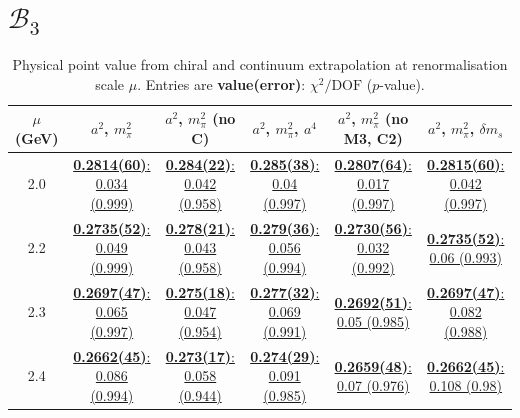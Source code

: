 \documentclass[12pt]{extarticle}
\begin{document}
\section{$\mathcal{B}_3$}
\begin{table}[h!]
\begin{center}
\begin{tabular}{|c|c|c|c|c|c|}
\hline
$\mu$ (GeV) & $a^2$, $m_\pi^2$& $a^2$, $m_\pi^2$ (no C)& $a^2$, $m_\pi^2$, $a^4$& $a^2$, $m_\pi^2$ (no M3, C2)& $a^2$, $m_\pi^2$, $\delta m_s$\\
\hline
2.0& \hyperlink{SSmPP/SUSY/bag_a2m2_20.pdf.1}{\textbf{0.2814(60)}: 0.034 (0.999)} & \hyperlink{SSmPP/SUSY/bag_a2m2noC_20.pdf.1}{\textbf{0.284(22)}: 0.042 (0.958)} & \hyperlink{SSmPP/SUSY/bag_a2a4m2_20.pdf.1}{\textbf{0.285(38)}: 0.04 (0.997)} & \hyperlink{SSmPP/SUSY/bag_a2m2mcut_20.pdf.1}{\textbf{0.2807(64)}: 0.017 (0.997)} & \hyperlink{SSmPP/SUSY/bag_a2m2delm_20.pdf.1}{\textbf{0.2815(60)}: 0.042 (0.997)}\\
2.2& \hyperlink{SSmPP/SUSY/bag_a2m2_22.pdf.1}{\textbf{0.2735(52)}: 0.049 (0.999)} & \hyperlink{SSmPP/SUSY/bag_a2m2noC_22.pdf.1}{\textbf{0.278(21)}: 0.043 (0.958)} & \hyperlink{SSmPP/SUSY/bag_a2a4m2_22.pdf.1}{\textbf{0.279(36)}: 0.056 (0.994)} & \hyperlink{SSmPP/SUSY/bag_a2m2mcut_22.pdf.1}{\textbf{0.2730(56)}: 0.032 (0.992)} & \hyperlink{SSmPP/SUSY/bag_a2m2delm_22.pdf.1}{\textbf{0.2735(52)}: 0.06 (0.993)}\\
2.3& \hyperlink{SSmPP/SUSY/bag_a2m2_23.pdf.1}{\textbf{0.2697(47)}: 0.065 (0.997)} & \hyperlink{SSmPP/SUSY/bag_a2m2noC_23.pdf.1}{\textbf{0.275(18)}: 0.047 (0.954)} & \hyperlink{SSmPP/SUSY/bag_a2a4m2_23.pdf.1}{\textbf{0.277(32)}: 0.069 (0.991)} & \hyperlink{SSmPP/SUSY/bag_a2m2mcut_23.pdf.1}{\textbf{0.2692(51)}: 0.05 (0.985)} & \hyperlink{SSmPP/SUSY/bag_a2m2delm_23.pdf.1}{\textbf{0.2697(47)}: 0.082 (0.988)}\\
2.4& \hyperlink{SSmPP/SUSY/bag_a2m2_24.pdf.1}{\textbf{0.2662(45)}: 0.086 (0.994)} & \hyperlink{SSmPP/SUSY/bag_a2m2noC_24.pdf.1}{\textbf{0.273(17)}: 0.058 (0.944)} & \hyperlink{SSmPP/SUSY/bag_a2a4m2_24.pdf.1}{\textbf{0.274(29)}: 0.091 (0.985)} & \hyperlink{SSmPP/SUSY/bag_a2m2mcut_24.pdf.1}{\textbf{0.2659(48)}: 0.07 (0.976)} & \hyperlink{SSmPP/SUSY/bag_a2m2delm_24.pdf.1}{\textbf{0.2662(45)}: 0.108 (0.98)}\\
\hline
\end{tabular}
\caption{Physical point value from chiral and continuum extrapolation at renormalisation scale $\mu$. Entries are \textbf{value(error)}: $\chi^2/\text{DOF}$ ($p$-value).}
\end{center}
\end{table}
\end{document}
